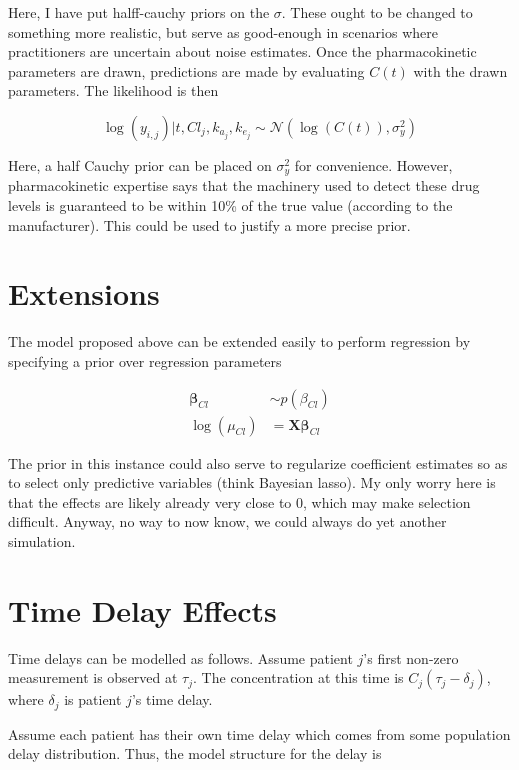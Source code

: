 \documentclass[12pt,a4paper]{book}
\begin{document}
 \noindent Here, I have put halff-cauchy priors on the $ \sigma $.  These ought to be changed to something more realistic, but serve as good-enough in scenarios where practitioners are uncertain about noise estimates.  Once the pharmacokinetic parameters are drawn, predictions are made by evaluating $C(t)$ with the drawn parameters.  The likelihood is then
 
  \begin{equation}
 \log(y_{i,j}) \vert t, Cl_{j}, k_{a_j}, k_{e_j} \sim \mathcal{N}(\log(C(t)), \sigma^2_y)
 \end{equation}
 
 Here, a half Cauchy prior can be placed on $\sigma^2_y$ for convenience.  However, pharmacokinetic expertise says that the machinery used to detect these drug levels is guaranteed to be within 10\% of the true value (according to the manufacturer). This could be used to justify a more precise prior.
 
\section{Extensions}

The model proposed above can be extended easily to perform regression by specifying a prior over regression parameters 

\begin{align}
	\bm{\beta}_{Cl} &\sim p(\beta_{Cl})\\
	\log(\mu_{Cl}) &= \mathbf{X}\bm{\beta}_{Cl}
\end{align}

\noindent The prior in this instance could also serve to regularize coefficient estimates so as to select only predictive variables (think Bayesian lasso).  My only worry here is that the effects are likely already very close to 0, which may make selection difficult.  Anyway, no way to now know, we could always do yet another simulation.

\section{Time Delay Effects}

Time delays can be modelled as follows.  Assume patient $ j $'s first non-zero measurement is observed at $ \tau_j $.  The concentration at this time is $ C_j(\tau_j - \delta_j) $, where $ \delta_j $ is patient $ j $'s time delay.

Assume each patient has their own time delay which comes from some population delay distribution.  Thus, the model structure for the delay is
\end{document}
